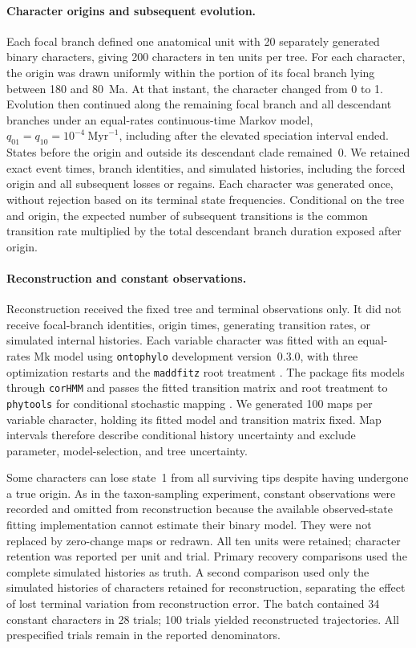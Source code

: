 \paragraph{Character origins and subsequent evolution.}
Each focal branch defined one anatomical unit with 20 separately generated
binary characters, giving 200 characters in ten units per tree. For each
character, the origin was drawn uniformly within the portion of its focal
branch lying between 180 and 80~Ma. At that instant, the character changed
from 0 to 1. Evolution then continued along the remaining focal branch and
all descendant branches under an equal-rates continuous-time Markov model,
$q_{01}=q_{10}=10^{-4}~\mathrm{Myr}^{-1}$, including after the elevated
speciation interval ended. States before the origin and outside its
descendant clade remained~0. We retained exact event times, branch identities,
and simulated histories, including the forced origin and all subsequent
losses or regains. Each character was generated once, without rejection
based on its terminal state frequencies. Conditional on the tree and origin,
the expected number of subsequent transitions is the common transition rate
multiplied by the total descendant branch duration exposed after origin.

\paragraph{Reconstruction and constant observations.}
Reconstruction received the fixed tree and terminal observations only.
It did not receive focal-branch identities, origin times, generating transition
rates, or simulated internal histories. Each variable character was fitted
with an equal-rates Mk model using \texttt{ontophylo} development version~0.3.0,
with three optimization restarts and the \texttt{maddfitz} root treatment
\citep{fitzjohn2009}. The package fits models through \texttt{corHMM} and
passes the fitted transition matrix and root treatment to \texttt{phytools}
for conditional stochastic mapping \citep{corHMM,revell2024}.
We generated 100 maps per variable character, holding its fitted model and
transition matrix fixed. Map intervals therefore describe conditional
history uncertainty and exclude parameter, model-selection, and tree uncertainty.

Some characters can lose state~1 from all surviving tips despite having
undergone a true origin. As in the taxon-sampling experiment, constant
observations were recorded and omitted from reconstruction because the
available observed-state fitting implementation cannot estimate their
binary model. They were not replaced by zero-change maps or redrawn.
All ten units were retained; character retention was reported per unit and
trial. Primary recovery comparisons used the complete simulated histories
as truth. A second comparison used only the simulated histories of characters
retained for reconstruction, separating the effect of lost terminal
variation from reconstruction error. The batch contained
34 constant characters in 28
trials; 100 trials yielded reconstructed trajectories.
All prespecified trials remain in the reported denominators.

